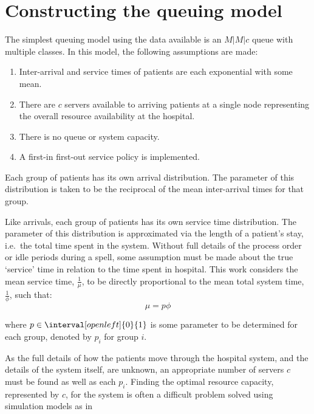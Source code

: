 \section{Constructing the queuing model}\label{sec:wasserstein}

The simplest queuing model using the data available is an \(M|M|c\) queue with
multiple classes. In this model, the following assumptions are made:
\begin{enumerate}
    \item Inter-arrival and service times of patients are each exponential with
        some mean.
    \item There are $c$ servers available to arriving patients at a single node
        representing the overall resource availability at the hospital.
    \item There is no queue or system capacity.
    \item A first-in first-out service policy is implemented.
\end{enumerate}

Each group of patients has its own arrival distribution. The parameter of this
distribution is taken to be the reciprocal of the mean inter-arrival times for
that group.

Like arrivals, each group of patients has its own service time distribution.
The parameter of this distribution is approximated via the length of a patient's
stay, i.e.\ the total time spent in the system. Without full details of the
process order or idle periods during a spell, some assumption must be made about
the true `service' time in relation to the time spent in hospital. This work
considers the mean service time, \(\frac{1}{\mu}\), to be directly proportional
to the mean total system time, \(\frac{1}{\phi}\), such that:
\begin{equation}
    \mu = p \phi
\end{equation}

\noindent where \(p \in \interval[open left]{0}{1}\) is some parameter to be
determined for each group, denoted by \(p_i\) for group \(i\).

As the full details of how the patients move through the hospital system, and
the details of the system itself, are unknown, an appropriate number of servers
\(c\) must be found as well as each \(p_i\). Finding the optimal resource
capacity, represented by \(c\), for the system is often a difficult problem
solved using simulation models as in~\cite{Williams2015,Steins2013}

